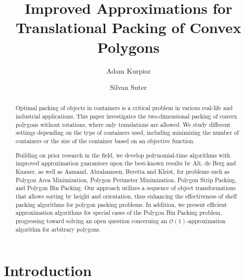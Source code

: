 \documentclass[a4paper,UKenglish,cleveref, autoref, thm-restate]{lipics_v2021}
\title{Improved Approximations for Translational Packing of Convex Polygons} %
\author{Adam Kurpisz}{Bern University of Applied Sciences and Department of Mathematics, ETH Zurich, Switzerland \and \url{https://n.ethz.ch/~kurpisza/} }{adam.kurpisz@ifor.math.ethz.ch}{https://orcid.org/0000-0002-2320-4482}{}%
\author{Silvan Suter}{Department of Mathematics, ETH Zurich, Switzerland}{sili.suter@bluewin.ch}{[orcid]}{}
\begin{document}
\maketitle

\begin{abstract}
Optimal packing of objects in containers is a critical problem in various real-life and industrial applications. This paper investigates the two-dimensional packing of convex polygons without rotations, where only translations are allowed. We study different settings depending on the type of containers used, including minimizing the number of containers or the size of the container based on an objective function.

Building on prior research in the field, we develop polynomial-time algorithms with improved approximation guarantees upon the best-known results by Alt, de Berg and Knauer, as well as Aamand, Abrahamsen, Beretta and Kleist, for problems such as Polygon Area Minimization, Polygon Perimeter Minimization, Polygon Strip Packing, and Polygon Bin Packing. Our approach utilizes a sequence of object transformations that allows sorting by height and orientation, thus enhancing the effectiveness of shelf packing algorithms for polygon packing problems. In addition, we present efficient approximation algorithms for special cases of the Polygon Bin Packing problem, progressing toward solving an open question concerning an $\mathcal{O}(1)$-approximation algorithm for arbitrary polygons.
\end{abstract}


\newpage
\section{Introduction}

\end{document}
